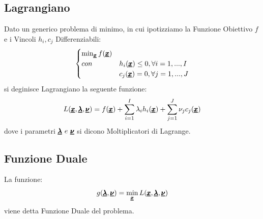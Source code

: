 \subsection{Lagrangiano}
Dato un generico problema di minimo, in cui ipotizziamo la Funzione Obiettivo $f$ e i Vincoli $h_i, c_j$ Differenziabili:
\begin{equation*}
    \begin{cases}
    \min_{\pmb{\underline{x}}} f(\pmb{\underline{x}}) \\
    con &h_i(\pmb{\underline{x}}) \leq 0, \forall i = 1,...,I\\
    & c_j(\pmb{\underline{x}}) = 0, \forall j = 1,..., J
    \end{cases}
\end{equation*}
si deginisce Lagrangiano la seguente funzione:
\begin{equation*}
    L(\pmb{\underline{x}}, \pmb{\underline{\lambda}}, \pmb{\underline{\nu}}) = f(\pmb{\underline{x}}) + \sum_{i=1}^I \lambda_i h_i(\pmb{\underline{x}}) +  \sum_{j=1}^J \nu_j c_j(\pmb{\underline{x}}) 
\end{equation*}
dove i parametri $\pmb{\underline{\lambda}} \ e \ \pmb{\underline{\nu}}$ si dicono Moltiplicatori di Lagrange.
\subsection{Funzione Duale}
La funzione:
\begin{equation*}
    g(\pmb{\underline{\lambda}}, \pmb{\underline{\nu}}) = \min_{\pmb{\underline{x}}} L(\pmb{\underline{x}}, \pmb{\underline{\lambda}}, \pmb{\underline{\nu}})
\end{equation*}
viene detta Funzione Duale del problema.

